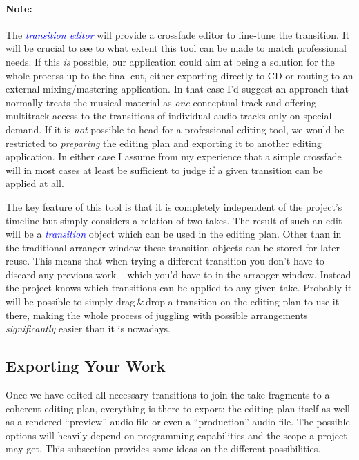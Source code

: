 \documentclass[11pt,a4paper]{article}
\newcommand*{\term}[1]{\textcolor{blue}{\emph{#1}}}
\begin{document}
\paragraph{Note:}
The \term{transition editor} will provide a crossfade editor to fine-tune the
transition.
It will be crucial to see to what extent this tool can be made to match
professional needs.
If this \emph{is} possible, our application could aim at being a solution for the
whole process up to the final cut, either exporting directly to CD or routing to
an external mixing/mastering application.
In that case I'd suggest an approach that normally treats the musical material
as \emph{one} conceptual track and offering multitrack access to the transitions
of individual audio tracks only on special demand.
If it is \emph{not} possible to head for a professional editing tool, we would be
restricted to \emph{preparing} the editing plan and exporting it to another
editing application.
In either case I assume from my experience that a simple crossfade will in most
cases at least be sufficient to judge if a given transition can be applied at
all.

\medskip
The key feature of this tool is that it is completely independent of the
project's timeline but simply considers a relation of two takes.
The result of such an edit will be a \term{transition} object which can be used
in the editing plan.
Other than in the traditional arranger window these transition objects can be
stored for later reuse.
This means that when trying a different transition you don't have to discard any
previous work -- which you'd have to in the arranger window.
Instead the project knows which transitions can be applied to any given take.
Probably it will be possible to simply drag\,\&\,drop a transition on the
editing plan to use it there, making the whole process of juggling with possible
arrangements \emph{significantly} easier than it is nowadays.

\subsection{Exporting Your Work}

Once we have edited all necessary transitions to join the take fragments to a
coherent editing plan, everything is there to export: the editing plan itself as well
as a rendered “preview” audio file or even a “production” audio file.
The possible options will heavily depend on programming capabilities and the scope
a project may get. This subsection provides some ideas on the different
possibilities.
\end{document}
